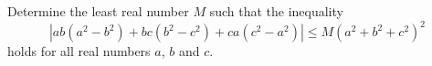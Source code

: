 Determine the least real number $M$ such that the inequality
\[ \left\lvert ab(a^2-b^2)+bc(b^2-c^2)+ca(c^2-a^2) \right\rvert
  \leq M\left( a^2+b^2+c^2 \right)^2 \]
holds for all real numbers $a$, $b$ and $c$.
